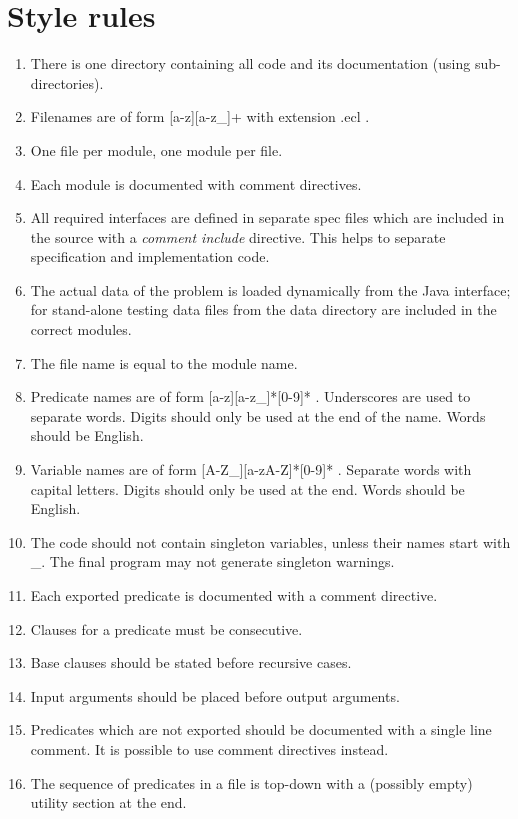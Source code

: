 \section{Style rules}
\begin{enumerate}
\item  There is one directory containing all code and its documentation (using sub-directories).
\item  Filenames are of form [a-z][a-z\_]+ with extension .ecl .
\item  One file per module, one module per file.
\item  Each module is documented with comment directives.
\item  All required interfaces are defined in separate spec files which are included in the source with a {\it comment include} directive. This helps to separate specification and implementation code.
\item  The actual data of the problem is loaded dynamically from the Java interface; for stand-alone testing data files from the data directory are included in the correct modules.
\item  The file name is equal to the module name.
\item  Predicate names are of form [a-z][a-z\_]*[0-9]* . Underscores are used to separate words. Digits should only be used at the end of the name. Words should be English.
\item  Variable names are of form [A-Z\_][a-zA-Z]*[0-9]* . Separate words with capital letters. Digits should only be used at the end. Words should be English.
\item  The code should not contain singleton variables, unless their names start with \_. The final program may not generate singleton warnings.
\item  Each exported predicate is documented with a comment directive.
\item  Clauses for a predicate must be consecutive.
\item  Base clauses should be stated before recursive cases.
\item  Input arguments should be placed before output arguments.
\item  Predicates which are not exported should be documented with a single line comment. It is possible to use comment directives instead.
\item  The sequence of predicates in a file is top-down with a (possibly empty) utility section at the end.

\end{enumerate}
